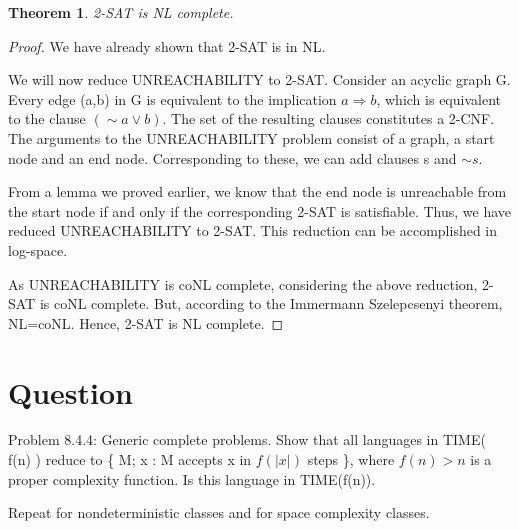 \documentclass[10pt]{amsart}
\newtheorem{thm}{Theorem}[subsection]
\theoremstyle{remark}
\begin{document}
\begin{thm}
 2-SAT is NL complete.
\end{thm}
\begin{proof}
We have already shown that 2-SAT is in NL.

We will now reduce UNREACHABILITY to 2-SAT. Consider an acyclic graph G. Every edge (a,b) in G is equivalent to the implication $a \Rightarrow b$, which is equivalent to the clause $(\sim a \vee b)$. The set of the resulting clauses constitutes a 2-CNF. The arguments to the UNREACHABILITY problem consist of a graph, a start node and an end node. Corresponding to these, we can add clauses s and $\sim s$.

From a lemma we proved earlier, we know that the end node is unreachable from the start node if and only if the corresponding 2-SAT is satisfiable. Thus, we have reduced UNREACHABILITY to 2-SAT. This reduction can be accomplished in log-space.

As UNREACHABILITY is coNL complete, considering the above reduction, 2-SAT is coNL complete. But, according to the Immermann Szelepcsenyi theorem, NL=coNL. Hence, 2-SAT is NL complete.
\end{proof}


\section{Question}
Problem 8.4.4: Generic complete problems. Show that all languages in TIME( f(n) ) reduce to \{ M; x : M accepts x in $f(|x|)$ steps \}, where $f(n)>n$ is a proper complexity function. Is this language in TIME(f(n)).

Repeat for nondeterministic classes and for space complexity classes.
\end{document}
